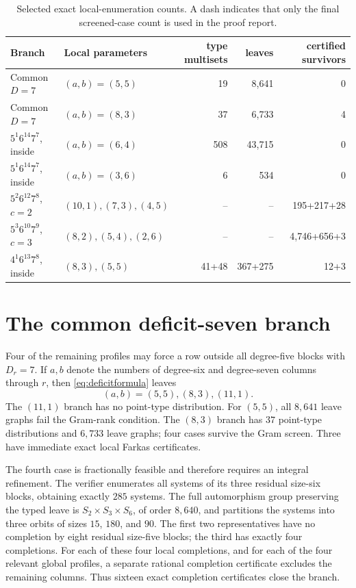 \documentclass[11pt]{amsart}
\begin{document}
\begin{table}[ht]
\centering
\small
\begin{tabular}{@{}llrrr@{}}
\toprule
Branch & Local parameters & type multisets & leaves & certified survivors\\
\midrule
Common $D=7$ & $(a,b)=(5,5)$ & 19 & 8,641 & 0\\
Common $D=7$ & $(a,b)=(8,3)$ & 37 & 6,733 & 4\\
$5^1 6^{14}7^7$, inside & $(a,b)=(6,4)$ & 508 & 43,715 & 0\\
$5^1 6^{14}7^7$, inside & $(a,b)=(3,6)$ & 6 & 534 & 0\\
$5^2 6^{12}7^8$, $c=2$ & $(10,1),(7,3),(4,5)$ & -- & -- & 195+217+28\\
$5^3 6^{10}7^9$, $c=3$ & $(8,2),(5,4),(2,6)$ & -- & -- & 4,746+656+3\\
$4^1 6^{13}7^8$, inside & $(8,3),(5,5)$ & 41+48 & 367+275 & 12+3\\
\bottomrule
\end{tabular}
\caption{Selected exact local-enumeration counts. A dash indicates that only the final screened-case count is used in the proof report.}
\label{tab:localcounts}
\end{table}

\section{The common deficit-seven branch}
Four of the remaining profiles may force a row outside all degree-five blocks with $D_r=7$. If $a,b$ denote the numbers of degree-six and degree-seven columns through $r$, then \eqref{eq:deficitformula} leaves
\[
 (a,b)=(5,5),(8,3),(11,1).
\]
The $(11,1)$ branch has no point-type distribution. For $(5,5)$, all $8{,}641$ leave graphs fail the Gram-rank condition. The $(8,3)$ branch has $37$ point-type distributions and $6{,}733$ leave graphs; four cases survive the Gram screen. Three have immediate exact local Farkas certificates.

The fourth case is fractionally feasible and therefore requires an integral refinement. The verifier enumerates all systems of its three residual size-six blocks, obtaining exactly $285$ systems. The full automorphism group preserving the typed leave is $S_2\times S_3\times S_6$, of order $8{,}640$, and partitions the systems into three orbits of sizes $15$, $180$, and $90$. The first two representatives have no completion by eight residual size-five blocks; the third has exactly four completions. For each of these four local completions, and for each of the four relevant global profiles, a separate rational completion certificate excludes the remaining columns. Thus sixteen exact completion certificates close the branch.
\end{document}
